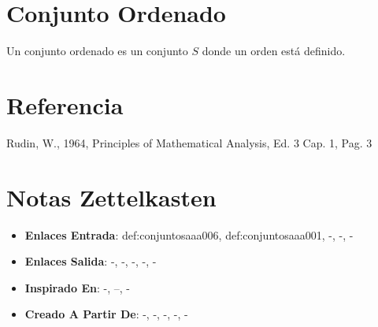 \documentclass[12pt]{article}
\begin{document}
\section*{Conjunto Ordenado}

\begin{definition}
Un conjunto ordenado es un conjunto $S$ donde un orden está definido.
\end{definition}

\section*{Referencia}
Rudin, W., 1964, Principles of Mathematical Analysis, Ed. 3 Cap. 1, Pag. 3 

\section*{Notas Zettelkasten}
\begin{itemize}
  \item \textbf{Enlaces Entrada}: def:conjuntosaaa006, def:conjuntosaaa001, -, -, -
  \item \textbf{Enlaces Salida}: -, -, -, -, -
  \item \textbf{Inspirado En}: -, --, -
  \item \textbf{Creado A Partir De}: -, -, -, -, -
\end{itemize}
\end{document}
